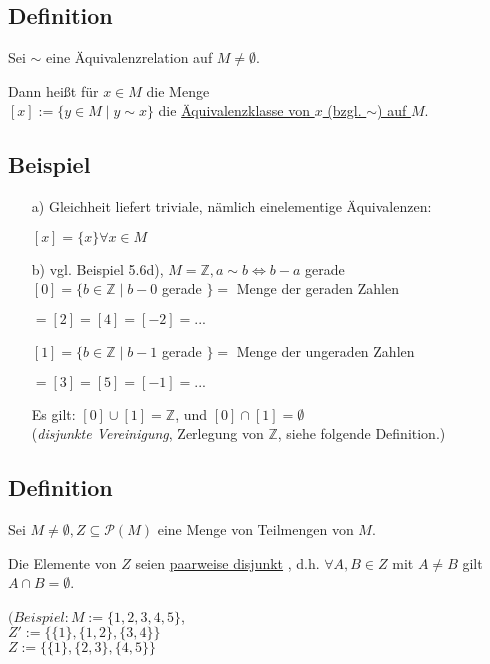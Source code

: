 \documentclass[a4paper, 12pt, twoside] {article}
\begin{document}
\subsection{Definition}
Sei $\sim$ eine Äquivalenzrelation auf $M \neq \emptyset$.

Dann heißt für $x \in M$ die Menge \\
$[x] := \{y \in M \mid y \sim x \}$ die \underline{Äquivalenzklasse von $x$ (bzgl. $\sim$) auf $M$}.

\subsection{Beispiel}

\begin{itemize}
\item[a)] Gleichheit liefert triviale, nämlich einelementige Äquivalenzen:

$[x] = \{x\} \forall x \in M$

\item[b)] vgl. Beispiel 5.6d), $M = \mathbb{Z}, a \sim b \Leftrightarrow b-a$ gerade \\
$[0] = \{b \in \mathbb{Z} \mid b-0$ gerade $\} = $ Menge der geraden Zahlen

\qquad $= [2] = [4] = [-2] = ...$

$[1] = \{b \in \mathbb{Z} \mid b-1$ gerade $\} = $ Menge der ungeraden Zahlen

\qquad $= [3] = [5] = [-1] = ...$

Es gilt: $[0] \cup [1] = \mathbb{Z}$, und $[0] \cap [1] = \emptyset$ \\
(\textit{disjunkte Vereinigung}, Zerlegung von $\mathbb{Z}$, siehe folgende Definition.)
\end{itemize}

\subsection{Definition}
Sei $M \neq \emptyset, Z \subseteq \mathcal{P}(M)$ eine Menge von Teilmengen von $M$.

Die Elemente von $Z$ seien \underline{paarweise disjunkt} , d.h. $\forall A, B \in Z$ mit $A \neq B$ gilt $A \cap B = \emptyset$.

$(Beispiel: M := \{1, 2, 3, 4, 5\}$, \\
$Z' := \{\{1\}, \{1, 2\}, \{3, 4\}\}$ \\
$Z := \{\{1\}, \{2, 3\}, \{4, 5\}\}$ \\
\end{document}
